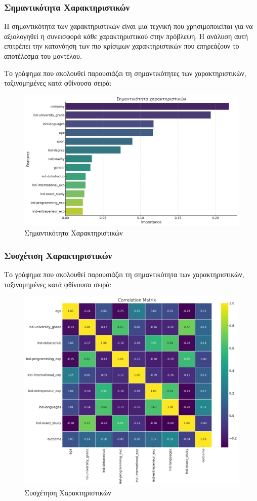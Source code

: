 \documentclass[12pt,twoside]{article}
\begin{document}
\subsubsection{Σημαντικότητα Χαρακτηριστικών}

Η σημαντικότητα των χαρακτηριστικών είναι μια τεχνική που χρησιμοποιείται για να αξιολογηθεί η συνεισφορά κάθε χαρακτηριστικού στην πρόβλεψη. Η ανάλυση αυτή επιτρέπει την κατανόηση των πιο κρίσιμων χαρακτηριστικών που επηρεάζουν το αποτέλεσμα του μοντέλου.

 Το γράφημα που ακολουθεί παρουσιάζει τη σημαντικότητες των χαρακτηριστικών, ταξινομημένες κατά φθίνουσα σειρά:
\begin{figure}[H]
\centering
\includegraphics[width=170mm]{feature_importance.png}
    \caption{Σημαντικότητα Χαρακτηριστικών}
    \label{fig:feature_importance}
\end{figure}

\subsubsection{Συσχέτιση Χαρακτηριστικών}

 Το γράφημα που ακολουθεί παρουσιάζει τη σημαντικότητα των χαρακτηριστικών, ταξινομημένες κατά φθίνουσα σειρά:
\begin{figure}[H]
\centering
\includegraphics[width=120mm]{correlation_matrix.png}
    \caption{Συσχέτηση Χαρακτηριστικών}
    \label{fig:correlation_matrix}
\end{figure}
\end{document}
